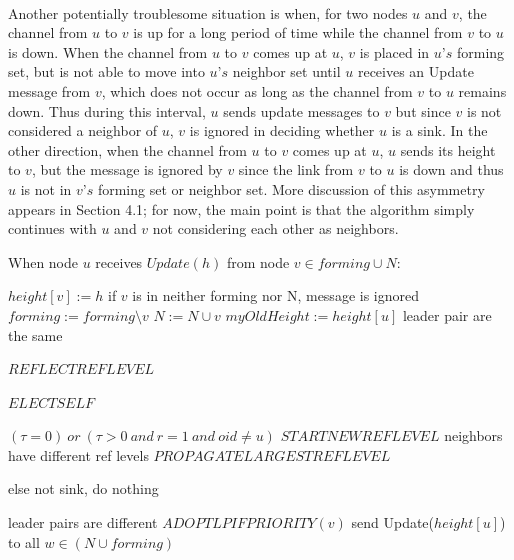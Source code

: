 \paragraph{}Another potentially troublesome situation is when, for two nodes $u$ and $v$, the channel from $u$ to $v$ is up for a long period of time while the channel from $v$ to $u$ is down. When the channel from $u$ to $v$ comes up at $u$, $v$ is placed in $u’s$ forming set, but is not able to move into $u’s$ neighbor set until $u$ receives an Update message from $v$, which does not occur as long as the channel from $v$ to $u$ remains down. Thus during this interval, $u$ sends update messages to $v$ but since $v$ is not considered a neighbor of $u$, $v$ is ignored in deciding whether $u$ is a sink. In the other direction, when the channel from $u$ to $v$ comes up at $u$, $u$ sends its height to $v$, but the message is ignored by $v$ since the link from $v$ to $u$ is down and thus $u$ is not in $v’s$ forming set or neighbor set. More discussion of this asymmetry appears in Section 4.1; for now, the main point is that the algorithm simply continues with $u$ and $v$ not considering each other as neighbors.

\begin{algorithm}
	\caption{When node $u$ receives $Update(h)$ from node $v \in forming \cup N$:}
\begin{algorithmic}[1]
	
	\State $height[v] := h$ \Comment if $v$ is in neither forming nor N, message is ignored
	\State $forming := forming \setminus {v}$
	\State $N := N \cup {v}$
	\State $myOldHeight := height[u]$
	 \Comment leader pair are the same
	
	
		\State $REFLECTREFLEVEL$
	
		\State $ELECTSELF$
		
		\Else \Comment $(\tau = 0)~or~(\tau > 0~and~r = 1~and~oid \neq u)$
		\State $STARTNEWREFLEVEL$
		\EndIf
	\Else \Comment neighbors have different ref levels
	\State $PROPAGATELARGESTREFLEVEL$
	
	\EndIf 
	
	\EndIf \Comment else not sink, do nothing
	
	\Else \Comment leader pairs are different
	\State $ADOPTLPIFPRIORITY(v)$	
	\EndIf
	\State send Update($height[u]$) to all $w \in (N \cup forming)$
	\EndIf
	
\end{algorithmic}

\end{algorithm}

